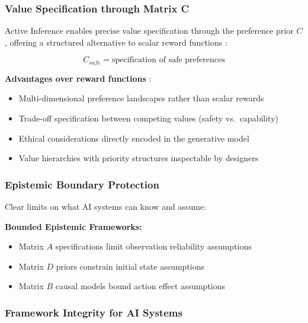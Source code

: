 \documentclass[
]{article}
\providecommand{\tightlist}{%
  \setlength{\itemsep}{0pt}\setlength{\parskip}{0pt}}
\begin{document}
\subsubsection{Value Specification through Matrix
C}\label{value-specification-through-matrix-c}

Active Inference enables precise value specification through the
preference prior \(C\), offering a structured alternative to scalar
reward functions \citep{ngo2022alignment}:

\begin{equation}
C_{safe} = \text{specification of safe preferences}
\label{eq:safe_preferences}
\end{equation}

\textbf{Advantages over reward functions} \citep{russell2019human}:

\begin{itemize}
\tightlist
\item
  Multi-dimensional preference landscapes rather than scalar rewards
\item
  Trade-off specification between competing values (safety
  vs.~capability)
\item
  Ethical considerations directly encoded in the generative model
\item
  Value hierarchies with priority structures inspectable by designers
\end{itemize}

\subsubsection{Epistemic Boundary
Protection}\label{epistemic-boundary-protection}

Clear limits on what AI systems can know and assume:

\textbf{Bounded Epistemic Frameworks:}

\begin{itemize}
\tightlist
\item
  Matrix \(A\) specifications limit observation reliability assumptions
\item
  Matrix \(D\) priors constrain initial state assumptions
\item
  Matrix \(B\) causal models bound action effect assumptions
\end{itemize}

\subsubsection{Framework Integrity for AI
Systems}\label{framework-integrity-for-ai-systems}
\end{document}
